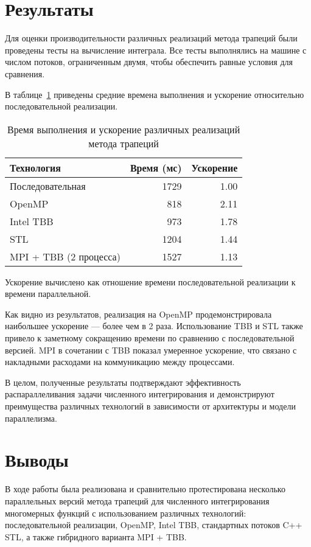 \documentclass[a4paper,14pt]{article}
\begin{document}
\newpage
\section{Результаты}

Для оценки производительности различных реализаций метода трапеций были проведены тесты на вычисление интеграла. Все тесты выполнялись на машине с числом потоков, ограниченным двумя, чтобы обеспечить равные условия для сравнения.

В таблице~\ref{tab:performance} приведены средние времена выполнения и ускорение относительно последовательной реализации.

\begin{table}[H]
  \centering
  \caption{Время выполнения и ускорение различных реализаций метода трапеций}
  \label{tab:performance}
  \begin{tabular}{|l|r|r|}
    \hline
    \textbf{Технология} & \textbf{Время (мс)} & \textbf{Ускорение} \\
    \hline
    Последовательная & 1729 & 1.00 \\
    OpenMP         & 818  & 2.11 \\
    Intel TBB       & 973  & 1.78 \\
    STL         & 1204 & 1.44 \\
    MPI + TBB (2 процесса)  & 1527 & 1.13 \\
    \hline
  \end{tabular}
\end{table}

Ускорение вычислено как отношение времени последовательной реализации к времени параллельной.

Как видно из результатов, реализация на OpenMP продемонстрировала наибольшее ускорение — более чем в 2 раза. Использование TBB и STL также привело к заметному сокращению времени по сравнению с последовательной версией. MPI в сочетании с TBB показал умеренное ускорение, что связано с накладными расходами на коммуникацию между процессами.

В целом, полученные результаты подтверждают эффективность распараллеливания задачи численного интегрирования и демонстрируют преимущества различных технологий в зависимости от архитектуры и модели параллелизма.

\newpage
\section{Выводы}

В ходе работы была реализована и сравнительно протестирована несколько параллельных версий метода трапеций для численного интегрирования многомерных функций с использованием различных технологий: последовательной реализации, OpenMP, Intel TBB, стандартных потоков C++ STL, а также гибридного варианта MPI + TBB.
\end{document}
